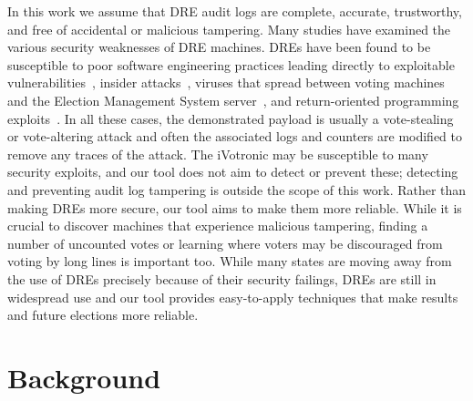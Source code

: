\documentclass[letterpaper,twocolumn,10pt]{article}
\begin{document}
In this work we assume that DRE audit logs
are complete, accurate, trustworthy, and free of accidental or malicious
tampering. 
Many studies have examined the various security weaknesses of DRE machines. DREs
have been found to be susceptible to poor software
engineering practices leading directly to exploitable
vulnerabilities~\cite{kohno2008, butler-evt08}, insider attacks~\cite{appel-evtwote09}, viruses that spread
between voting machines and the Election Management System
server~\cite{calandrino-toptobottom, Feldman07},  and
return-oriented programming exploits~\cite{Checkoway2009}. In all these cases, the demonstrated
payload is usually a vote-stealing or vote-altering attack and often the
associated logs and counters are modified to remove any traces of the attack. 
The iVotronic may be susceptible to many security exploits, and our tool does
not aim to detect or prevent these; detecting and preventing audit log tampering is outside the scope of
this work. Rather than making DREs more secure, our tool aims to make them  
more reliable. While it is crucial to discover machines that experience malicious 
tampering, finding a number of uncounted votes or learning where voters may be
discouraged from voting by long lines is important too. While many states are
moving away from the use of DREs precisely because of their security failings,
DREs are still in widespread use and our tool provides easy-to-apply techniques
that make results and future elections more reliable.

\section{Background}
\end{document}
